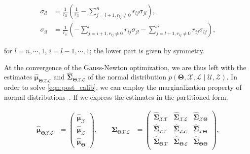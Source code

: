 \begin{equation}\label{eqn:covariance_QR}
  \begin{aligned}
  \sigma_{ll} &= \frac{1}{r_{ll}}(\frac{1}{r_{ll}} -
    \sum_{j = l + 1, r_{lj}\neq 0}^n r_{lj}\sigma_{jl}),\\
  \sigma_{il} &= \frac{1}{r_{ii}}
    (-\sum_{j = i + 1, r_{ij}\neq 0}^l r_{ij}\sigma_{jl} -
    \sum_{j = l + 1, r_{ij}\neq 0}^n r_{ij}\sigma_{lj}),
  \end{aligned}
\end{equation}

\noindent for $l=n,\cdots,1$, $i=l-1,\cdots,1$; the lower part is given by
symmetry.

At the convergence of the Gauss-Newton optimization, we are thus left with the
estimates $\hat{\boldsymbol{\mu}}_{\boldsymbol{\Theta}\mathcal{X}\mathcal{L}}$
and $\hat{\boldsymbol{\Sigma}}_{\boldsymbol{\Theta}\mathcal{X}\mathcal{L}}$ of
the normal distribution $p(\boldsymbol{\Theta}, \mathcal{X},\mathcal{L}
\mid\mathcal{U},\mathcal{Z})$. In order to solve \eqref{eqn:post_calib}, we can
employ the marginalization property of normal
distributions~\cite{bishop06pattern}. If we express the estimates in the
partitioned form,

\begin{equation}\label{eqn:partitioned_estimates}
  \begin{aligned}
  \hat{\boldsymbol{\mu}}_{\boldsymbol{\Theta}\mathcal{X}\mathcal{L}} &=
    \begin{pmatrix}
    \hat{\boldsymbol{\mu}}_{\mathcal{X}}\\
    \hat{\boldsymbol{\mu}}_{\mathcal{L}}\\
    \hat{\boldsymbol{\mu}}_{\boldsymbol{\Theta}}
    \end{pmatrix},\qquad
  \hat{\boldsymbol{\Sigma}}_{\boldsymbol{\Theta}\mathcal{X}\mathcal{L}} &=
    \begin{pmatrix}
    \hat{\boldsymbol{\Sigma}}_{\mathcal{X}\mathcal{X}}&
    \hat{\boldsymbol{\Sigma}}_{\mathcal{X}\mathcal{L}}&
    \hat{\boldsymbol{\Sigma}}_{\mathcal{X}\boldsymbol{\Theta}}\\
    \hat{\boldsymbol{\Sigma}}_{\mathcal{L}\mathcal{X}}&
    \hat{\boldsymbol{\Sigma}}_{\mathcal{L}\mathcal{L}}&
    \hat{\boldsymbol{\Sigma}}_{\mathcal{L}\boldsymbol{\Theta}}\\
    \hat{\boldsymbol{\Sigma}}_{\boldsymbol{\Theta}\mathcal{X}}&
    \hat{\boldsymbol{\Sigma}}_{\boldsymbol{\Theta}\mathcal{L}}&
    \hat{\boldsymbol{\Sigma}}_{\boldsymbol{\Theta}\boldsymbol{\Theta}}\\
    \end{pmatrix},
  \end{aligned}
\end{equation}

